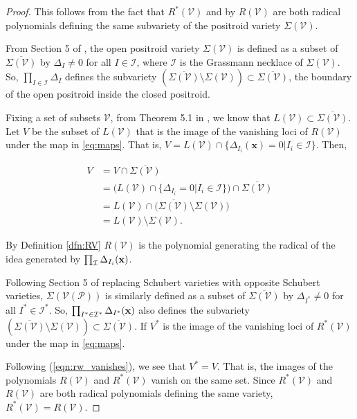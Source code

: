 \documentclass[11pt]{article}
\newcommand{\cP}{\mathcal{P}}
\newcommand{\cV}{\mathcal{V}}
\newcommand{\VP}{\cV(\cP)}
\theoremstyle{remark}
\theoremstyle{definition}
\begin{document}
\begin{proof}
This follows from the fact that $R^{\ast}(\cV)$ and by $R(\cV)$ are both radical polynomials defining the same subvariety of the positroid variety $\Sigma(\cV)$. 

From Section 5 of \cite{Juggling}, the open positroid variety $\Sigma(\cV)$ is defined as a subset of $\overline{\Sigma(\cV)}$ by $\Delta_I \neq 0$ for all $I \in \mathcal{I}$, where $\mathcal{I}$ is the Grassmann necklace of $\Sigma(\cV)$. So, $\prod_{I \in \mathcal{I}} \Delta_I$ defines the subvariety $(\overline{\Sigma(\cV)} \setminus \Sigma(\cV)) \subset \overline{\Sigma(\cV)}$, the boundary of the open positroid inside the closed positroid. 

Fixing a set of subsets $\cV$, from Theorem 5.1 in \cite{basisshapeloci}, we know that $L(\cV) \subset \overline{\Sigma(\cV)}$. Let $V$ be the subset of $L(\cV)$ that is the image of the vanishing loci of $R(\cV)$ under the map in \eqref{eq:maps}. That is, $V = L(\cV) \cap \{\Delta_{I_i}(\mathbf{x}) = 0 | I_i \in \mathcal{I}\}$. Then,

%
\begin{equation} \label{eqn:rw_vanishes}
\begin{split}
V & = V \cap \overline{\Sigma(\cV)} \\
& = \big(L(\cV) \cap \{\Delta_{I_i} = 0 |  I_i \in \mathcal{I}\}\big) \cap \overline{\Sigma(\cV)} \\
& = L(\cV) \cap \big(\overline{\Sigma(\cV)} \setminus \Sigma(\cV)\big) \\
& =  L(\cV) \setminus \Sigma(\cV).
\end{split}
\end{equation}


By Definition \ref{dfn:RV} $R(\cV)$ is the polynomial generating the radical of the idea generated by $\prod_\mathcal{I} \Delta_{I_i}(\bf{x})$. 

Following Section 5 of \cite{Juggling} replacing Schubert varieties with opposite Schubert varieties, $\Sigma(\VP)$ is similarly defined as a subset of $\overline{\Sigma(\cV)}$ by $\Delta_{I^{\ast}} \neq 0$ for all $I^{\ast} \in \mathcal{I}^{\ast}$. So, $\prod_{I^{\ast} \in \mathcal{I}^{\ast}} \Delta_{I^{\ast}}(\bf{x})$ also defines the subvariety $(\overline{\Sigma(\cV)} \setminus \Sigma(\cV)) \subset \overline{\Sigma(\cV)}$. If $V^\ast$ is the image of the vanishing loci of $R^\ast(\cV)$ under the map in \eqref{eq:maps}.

Following (\ref{eqn:rw_vanishes}), we see that $V^* = V$. That is, the images of the polynomials $R(\cV)$ and $R^{\ast}(\cV)$ vanish on the same set. Since  $R^{\ast}(\cV)$ and $R(\cV)$ are both radical polynomials defining the same variety, $R^{\ast}(\cV) = R(\cV)$. 
\end{proof} 
\end{document}
